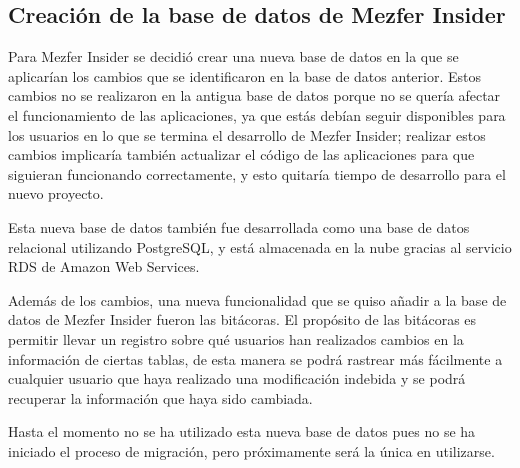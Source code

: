 \subsection{Creación de la base de datos de Mezfer Insider}
Para Mezfer Insider se decidió crear una nueva base de datos en la que se aplicarían los cambios que se identificaron en la base de datos anterior. Estos cambios no se realizaron en la antigua base de datos porque no se quería afectar el funcionamiento de las aplicaciones, ya que estás debían seguir disponibles para los usuarios en lo que se termina el desarrollo de Mezfer Insider; realizar estos cambios implicaría también actualizar el código de las aplicaciones para que siguieran funcionando correctamente, y esto quitaría tiempo de desarrollo para el nuevo proyecto.

Esta nueva base de datos también fue desarrollada como una base de datos relacional utilizando PostgreSQL, y está almacenada en la nube gracias al servicio RDS de Amazon Web Services.

Además de los cambios, una nueva funcionalidad que se quiso añadir a la base de datos de Mezfer Insider fueron las bitácoras. El propósito de las bitácoras es permitir llevar un registro sobre qué usuarios han realizados cambios en la información de ciertas tablas, de esta manera se podrá rastrear más fácilmente a cualquier usuario que haya realizado una modificación indebida y se podrá recuperar la información que haya sido cambiada.

Hasta el momento no se ha utilizado esta nueva base de datos pues no se ha iniciado el proceso de migración, pero próximamente será la única en utilizarse.